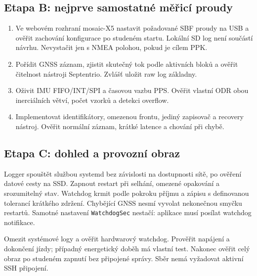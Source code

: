 \documentclass[11pt,a4paper]{article}
\newcommand{\novastrana}{\clearpage}
\begin{document}
\subsection{Etapa B: nejprve samostatné měřicí proudy}
\begin{enumerate}
\item Ve webovém rozhraní mosaic-X5 nastavit požadované SBF proudy na USB a ověřit zachování konfigurace po studeném startu. Lokální SD log není součástí návrhu. Nevystačit jen s NMEA polohou, pokud je cílem PPK.\cite{ardusimple,rxtools}
\item Pořídit GNSS záznam, zjistit skutečný tok podle aktivních bloků a ověřit čitelnost nástroji Septentrio. Zvlášť uložit raw log základny.
\item Oživit IMU FIFO/INT/SPI a časovou vazbu PPS. Ověřit vlastní ODR obou inerciálních větví, počet vzorků a detekci overflow.
\item Implementovat identifikátory, omezenou frontu, jediný zapisovač a recovery nástroj. Ověřit normální záznam, krátké latence a chování při chybě.
\end{enumerate}

\subsection{Etapa C: dohled a provozní obraz}
Logger spouštět službou systemd bez závislosti na dostupnosti sítě, po ověření datové cesty na SSD. Zapnout restart při selhání, omezené opakování a srozumitelný stav. Watchdog krmit podle pokroku příjmu a zápisu s definovanou tolerancí krátkého zdržení. Chybějící GNSS nesmí vyvolat nekonečnou smyčku restartů. Samotné nastavení \texttt{WatchdogSec} nestačí: aplikace musí posílat watchdog notifikace.\cite{service,notify}

Omezit systémové logy a ověřit hardwarový watchdog. Prověřit napájení a dokončení jízdy; případný energetický doběh má vlastní test. Nakonec ověřit celý obraz po studeném zapnutí bez připojené správy. Sběr nemá vyžadovat aktivní SSH připojení.

\novastrana
\end{document}
